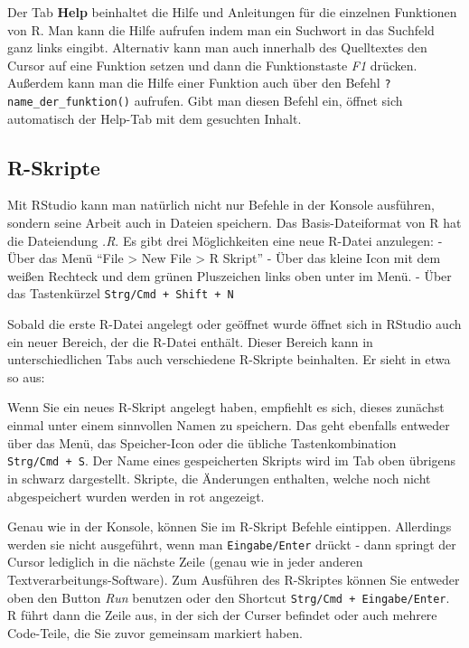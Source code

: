 \documentclass[
]{book}
\begin{document}
Der Tab \textbf{Help} beinhaltet die Hilfe und Anleitungen für die einzelnen Funktionen von R.
Man kann die Hilfe aufrufen indem man ein Suchwort in das Suchfeld ganz links eingibt. Alternativ kann man auch innerhalb des Quelltextes den Cursor auf eine Funktion setzen und dann die Funktionstaste \emph{F1} drücken.
Außerdem kann man die Hilfe einer Funktion auch über den Befehl \texttt{?name\_der\_funktion()} aufrufen. Gibt man diesen Befehl ein, öffnet sich automatisch der Help-Tab mit dem gesuchten Inhalt.

\hypertarget{r-skripte}{%
\subsection{R-Skripte}\label{r-skripte}}

Mit RStudio kann man natürlich nicht nur Befehle in der Konsole ausführen, sondern seine Arbeit auch in Dateien speichern. Das Basis-Dateiformat von R hat die Dateiendung \emph{.R}. Es gibt drei Möglichkeiten eine neue R-Datei anzulegen:
- Über das Menü ``File \textgreater{} New File \textgreater{} R Skript''
- Über das kleine Icon mit dem weißen Rechteck und dem grünen Pluszeichen links oben unter im Menü.
- Über das Tastenkürzel \texttt{Strg/Cmd\ +\ Shift\ +\ N}

Sobald die erste R-Datei angelegt oder geöffnet wurde öffnet sich in RStudio auch ein neuer Bereich, der die R-Datei enthält. Dieser Bereich kann in unterschiedlichen Tabs auch verschiedene R-Skripte beinhalten. Er sieht in etwa so aus:

Wenn Sie ein neues R-Skript angelegt haben, empfiehlt es sich, dieses zunächst einmal unter einem sinnvollen Namen zu speichern. Das geht ebenfalls entweder über das Menü, das Speicher-Icon oder die übliche Tastenkombination \texttt{Strg/Cmd\ +\ S}. Der Name eines gespeicherten Skripts wird im Tab oben übrigens in schwarz dargestellt. Skripte, die Änderungen enthalten, welche noch nicht abgespeichert wurden werden in rot angezeigt.

Genau wie in der Konsole, können Sie im R-Skript Befehle eintippen. Allerdings werden sie nicht ausgeführt, wenn man \texttt{Eingabe/Enter} drückt - dann springt der Cursor lediglich in die nächste Zeile (genau wie in jeder anderen Textverarbeitungs-Software). Zum Ausführen des R-Skriptes können Sie entweder oben den Button \emph{Run} benutzen oder den Shortcut \texttt{Strg/Cmd\ +\ Eingabe/Enter}. R führt dann die Zeile aus, in der sich der Curser befindet oder auch mehrere Code-Teile, die Sie zuvor gemeinsam markiert haben.
\end{document}
